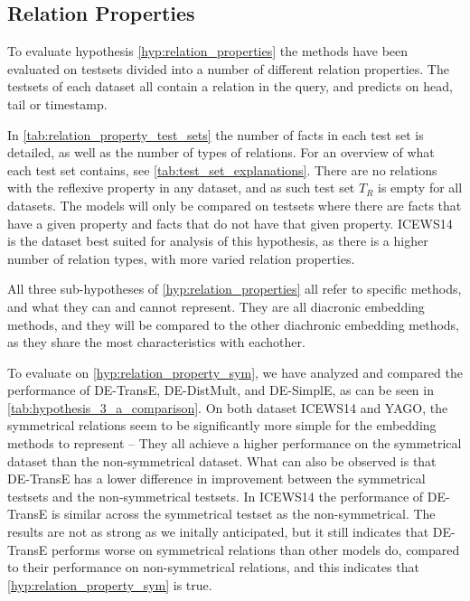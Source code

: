 \subsection{Relation Properties}
\label{sec:relation_properties_experiment}



%
%
%




To evaluate hypothesis \autoref{hyp:relation_properties} the methods have been evaluated on testsets divided into a number of different relation properties. The testsets of each dataset all contain a relation in the query, and predicts on head, tail or timestamp.

In \autoref{tab:relation_property_test_sets} the number of facts in each test set is detailed, as well as the number of types of relations.
For an overview of what each test set contains, see \autoref{tab:test_set_explanations}. There are no relations with the reflexive property in any dataset, and as such test set $T_R$ is empty for all datasets.
The models will only be compared on testsets where there are facts that have a given property and facts that do not have that given property. ICEWS14 is the dataset best suited for analysis of this hypothesis, as there is a higher number of relation types, with more varied relation properties.

All three sub-hypotheses of \autoref{hyp:relation_properties} all refer to specific methods, and what they can and cannot represent. They are all diacronic embedding methods, and they will be compared to the other diachronic embedding methods, as they share the most characteristics with eachother.

To evaluate on \autoref{hyp:relation_property_sym}, we have analyzed and compared the performance of DE-TransE, DE-DistMult, and DE-SimplE, as can be seen in \autoref{tab:hypothesis_3_a_comparison}.
On both dataset ICEWS14 and YAGO, the symmetrical relations seem to be significantly more simple for the embedding methods to represent -- They all achieve a higher performance on the symmetrical dataset than the non-symmetrical dataset. What can also be observed is that DE-TransE has a lower difference in improvement between the symmetrical testsets and the non-symmetrical testsets. In ICEWS14 the performance of DE-TransE is similar across the symmetrical testset as the non-symmetrical. The results are not as strong as we initally anticipated, but it still indicates that DE-TransE performs worse on symmetrical relations than other models do, compared to their performance on non-symmetrical relations, and this indicates that \autoref{hyp:relation_property_sym} is true.

